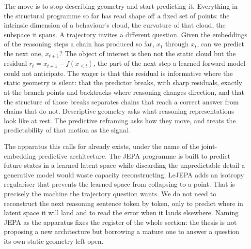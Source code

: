 The move is to stop describing geometry and start predicting it. Everything in
the structural programme so far has read shape off a fixed set of points: the
intrinsic dimension of a behaviour's cloud, the curvature of that cloud, the
subspace it spans. A trajectory invites a different question. Given the
embeddings of the reasoning steps a chain has produced so far, $x_1$ through
$x_t$, can we predict the next one, $x_{t+1}$? The object of interest is then not
the static cloud but the residual $r_t = x_{t+1} - f(x_{\le t})$, the part of the
next step a learned forward model could not anticipate. The wager is that this
residual is informative where the static geometry is silent: that the predictor
breaks, with sharp residuals, exactly at the branch points and backtracks where
reasoning changes direction, and that the structure of those breaks separates
chains that reach a correct answer from chains that do not. Descriptive geometry
asks what reasoning representations look like at rest. The predictive reframing
asks how they move, and treats the predictability of that motion as the signal.

The apparatus this calls for already exists, under the name of the
joint-embedding predictive architecture. The JEPA programme \citep{assael2025jepa,
bardes2025vjepa2} is built to predict future states in a learned latent space
while discarding the unpredictable detail a generative model would waste capacity
reconstructing; LeJEPA \citep{balestriero2025lejepa} adds an isotropy regulariser
that prevents the learned space from collapsing to a point. That is precisely the
machine the trajectory question wants. We do not need to reconstruct the next
reasoning sentence token by token, only to predict where in latent space it will
land and to read the error when it lands elsewhere. Naming JEPA as the apparatus
fixes the register of the whole section: the thesis is not proposing a new
architecture but borrowing a mature one to answer a question its own static
geometry left open.

